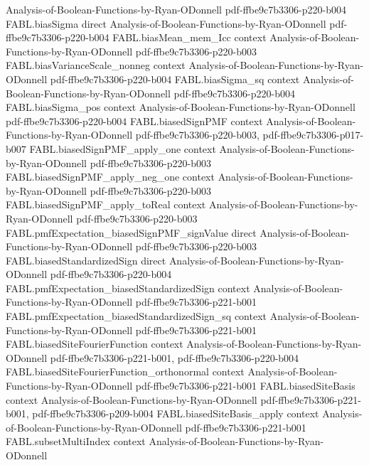 \begin{theorem}
  {Analysis-of-Boolean-Functions-by-Ryan-ODonnell}
  {pdf-ffbe9c7b3306-p220-b004}
\proofstep
  {FABL.biasSigma}
  {direct}
  {Analysis-of-Boolean-Functions-by-Ryan-ODonnell}
  {pdf-ffbe9c7b3306-p220-b004}
\proofstep
  {FABL.biasMean_mem_Icc}
  {context}
  {Analysis-of-Boolean-Functions-by-Ryan-ODonnell}
  {pdf-ffbe9c7b3306-p220-b003}
\proofstep
  {FABL.biasVarianceScale_nonneg}
  {context}
  {Analysis-of-Boolean-Functions-by-Ryan-ODonnell}
  {pdf-ffbe9c7b3306-p220-b004}
\proofstep
  {FABL.biasSigma_sq}
  {context}
  {Analysis-of-Boolean-Functions-by-Ryan-ODonnell}
  {pdf-ffbe9c7b3306-p220-b004}
\proofstep
  {FABL.biasSigma_pos}
  {context}
  {Analysis-of-Boolean-Functions-by-Ryan-ODonnell}
  {pdf-ffbe9c7b3306-p220-b004}
\proofstep
  {FABL.biasedSignPMF}
  {context}
  {Analysis-of-Boolean-Functions-by-Ryan-ODonnell}
  {pdf-ffbe9c7b3306-p220-b003,
    pdf-ffbe9c7b3306-p017-b007}
\proofstep
  {FABL.biasedSignPMF_apply_one}
  {context}
  {Analysis-of-Boolean-Functions-by-Ryan-ODonnell}
  {pdf-ffbe9c7b3306-p220-b003}
\proofstep
  {FABL.biasedSignPMF_apply_neg_one}
  {context}
  {Analysis-of-Boolean-Functions-by-Ryan-ODonnell}
  {pdf-ffbe9c7b3306-p220-b003}
\proofstep
  {FABL.biasedSignPMF_apply_toReal}
  {context}
  {Analysis-of-Boolean-Functions-by-Ryan-ODonnell}
  {pdf-ffbe9c7b3306-p220-b003}
\proofstep
  {FABL.pmfExpectation_biasedSignPMF_signValue}
  {direct}
  {Analysis-of-Boolean-Functions-by-Ryan-ODonnell}
  {pdf-ffbe9c7b3306-p220-b003}
\proofstep
  {FABL.biasedStandardizedSign}
  {direct}
  {Analysis-of-Boolean-Functions-by-Ryan-ODonnell}
  {pdf-ffbe9c7b3306-p220-b004}
\proofstep
  {FABL.pmfExpectation_biasedStandardizedSign}
  {context}
  {Analysis-of-Boolean-Functions-by-Ryan-ODonnell}
  {pdf-ffbe9c7b3306-p221-b001}
\proofstep
  {FABL.pmfExpectation_biasedStandardizedSign_sq}
  {context}
  {Analysis-of-Boolean-Functions-by-Ryan-ODonnell}
  {pdf-ffbe9c7b3306-p221-b001}
\proofstep
  {FABL.biasedSiteFourierFunction}
  {context}
  {Analysis-of-Boolean-Functions-by-Ryan-ODonnell}
  {pdf-ffbe9c7b3306-p221-b001,
    pdf-ffbe9c7b3306-p220-b004}
\proofstep
  {FABL.biasedSiteFourierFunction_orthonormal}
  {context}
  {Analysis-of-Boolean-Functions-by-Ryan-ODonnell}
  {pdf-ffbe9c7b3306-p221-b001}
\proofstep
  {FABL.biasedSiteBasis}
  {context}
  {Analysis-of-Boolean-Functions-by-Ryan-ODonnell}
  {pdf-ffbe9c7b3306-p221-b001,
    pdf-ffbe9c7b3306-p209-b004}
\proofstep
  {FABL.biasedSiteBasis_apply}
  {context}
  {Analysis-of-Boolean-Functions-by-Ryan-ODonnell}
  {pdf-ffbe9c7b3306-p221-b001}
\proofstep
  {FABL.subsetMultiIndex}
  {context}
  {Analysis-of-Boolean-Functions-by-Ryan-ODonnell}

\end{theorem}
